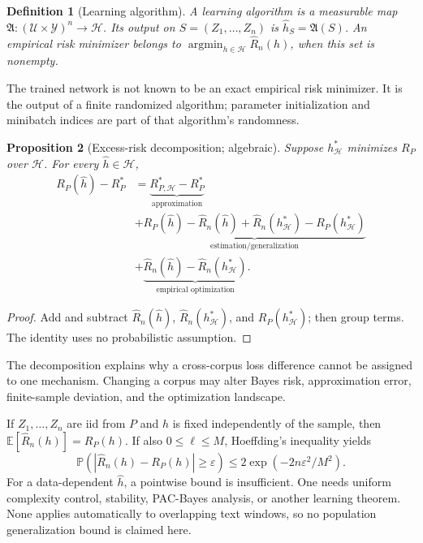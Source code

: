 \documentclass[11pt]{article}
\newtheorem{definition}{Definition}[section]
\newtheorem{proposition}[definition]{Proposition}
\newcommand{\E}{\mathbb E}
\newcommand{\1}{\mathbf 1}
\begin{document}
\begin{definition}[Learning algorithm]
A learning algorithm is a measurable map
$\mathfrak A:(\mathcal U\times\mathcal Y)^n\to\mathcal H$. Its output on
$S=(Z_1,\ldots,Z_n)$ is $\widehat h_S=\mathfrak A(S)$. An empirical risk
minimizer belongs to
$\operatorname*{argmin}_{h\in\mathcal H}\widehat R_n(h)$, when this set is
nonempty.
\end{definition}

The trained network is not known to be an exact empirical risk minimizer. It is
the output of a finite randomized algorithm; parameter initialization and
minibatch indices are part of that algorithm's randomness.

\begin{proposition}[Excess-risk decomposition; algebraic]
Suppose $h_{\mathcal H}^*$ minimizes $R_P$ over $\mathcal H$. For every
$\widehat h\in\mathcal H$,
\begin{align*}
 R_P(\widehat h)-R_P^*
 &=\underbrace{R_{P,\mathcal H}^*-R_P^*}_{\text{approximation}}\\
 &+\underbrace{R_P(\widehat h)-\widehat R_n(\widehat h)
 +\widehat R_n(h_{\mathcal H}^*)-R_P(h_{\mathcal H}^*)}_{
 \text{estimation/generalization}}\\
 &+\underbrace{\widehat R_n(\widehat h)-
 \widehat R_n(h_{\mathcal H}^*)}_{\text{empirical optimization}}.
\end{align*}
\end{proposition}

\begin{proof}
Add and subtract $\widehat R_n(\widehat h)$,
$\widehat R_n(h_{\mathcal H}^*)$, and $R_P(h_{\mathcal H}^*)$; then group
terms. The identity uses no probabilistic assumption.
\end{proof}

The decomposition explains why a cross-corpus loss difference cannot be
assigned to one mechanism. Changing a corpus may alter Bayes risk,
approximation error, finite-sample deviation, and the optimization landscape.

If $Z_1,\ldots,Z_n$ are iid from $P$ and $h$ is fixed independently of the
sample, then $\E[\widehat R_n(h)]=R_P(h)$. If also
$0\le\ell\le M$, Hoeffding's inequality yields
\[
 \mathbb P(|\widehat R_n(h)-R_P(h)|\ge\varepsilon)
 \le2\exp(-2n\varepsilon^2/M^2).
\]
For a data-dependent $\widehat h$, a pointwise bound is insufficient. One needs
uniform complexity control, stability, PAC-Bayes analysis, or another learning
theorem. None applies automatically to overlapping text windows, so no
population generalization bound is claimed here.
\end{document}
